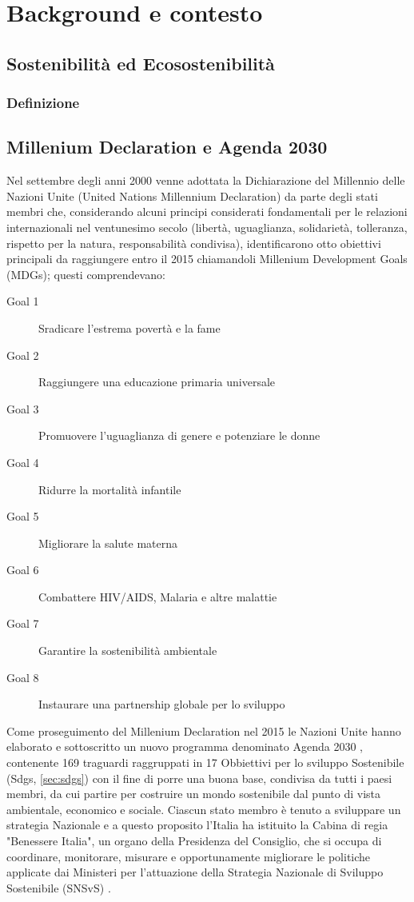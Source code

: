 \chapter{Background e contesto}
%
\section{Sostenibilità ed Ecosostenibilità}
\subsection{Definizione}
%
%
\section{Millenium Declaration e Agenda 2030}
Nel settembre degli anni 2000 venne adottata la Dichiarazione del Millennio delle Nazioni Unite (United Nations Millennium Declaration) \cite{millennium_declaration} da parte degli stati membri che, considerando alcuni principi considerati fondamentali per le relazioni internazionali nel ventunesimo secolo (libertà, uguaglianza, solidarietà, tolleranza, rispetto per la natura, responsabilità condivisa), identificarono otto obiettivi principali da raggiungere entro il 2015 chiamandoli Millenium Development Goals (MDGs); questi comprendevano:
\begin{description}
    \item[Goal 1] Sradicare l'estrema povertà e la fame
    \item[Goal 2] Raggiungere una educazione primaria universale
    \item[Goal 3] Promuovere l'uguaglianza di genere e potenziare le donne
    \item[Goal 4] Ridurre la mortalità infantile
    \item[Goal 5] Migliorare la salute materna
    \item[Goal 6] Combattere HIV/AIDS, Malaria e altre malattie
    \item[Goal 7] Garantire la sostenibilità ambientale
    \item[Goal 8] Instaurare una partnership globale per lo sviluppo
\end{description}

Come proseguimento del Millenium Declaration nel 2015 le Nazioni Unite hanno elaborato e sottoscritto un nuovo programma denominato Agenda 2030 \cite{agenda2030}, contenente 169 traguardi raggruppati in 17 Obbiettivi per lo sviluppo Sostenibile (Sdgs, \ref{sec:sdgs}) con il fine di porre una buona base, condivisa da tutti i paesi membri, da cui partire per costruire un mondo sostenibile dal punto di vista ambientale, economico e sociale.
%
Ciascun stato membro è tenuto a sviluppare un strategia Nazionale e a questo proposito l'Italia ha istituito la Cabina di regia "Benessere Italia", un organo della Presidenza del Consiglio, che si occupa di coordinare, monitorare, misurare e opportunamente migliorare le politiche applicate dai Ministeri per l'attuazione della Strategia Nazionale di Sviluppo Sostenibile (SNSvS) \cite{SNSvS}.

